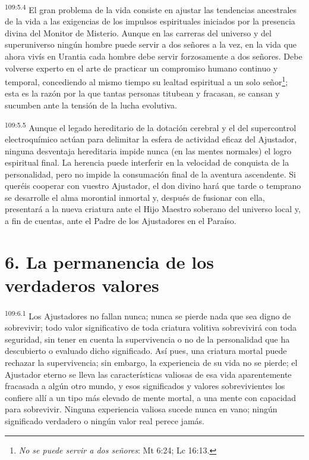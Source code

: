 \documentclass[twoside, 11pt]{book}
\begin{document}
\par
\textsuperscript{109:5.4} El gran problema de la vida consiste en ajustar las tendencias ancestrales de la vida a las exigencias de los impulsos espirituales iniciados por la presencia divina del Monitor de Misterio. Aunque en las carreras del universo y del superuniverso ningún hombre puede servir a dos señores a la vez, en la vida que ahora vivís en Urantia cada hombre debe servir forzosamente a dos señores. Debe volverse experto en el arte de practicar un compromiso humano continuo y temporal, concediendo al mismo tiempo su lealtad espiritual a un solo señor\footnote{\textit{No se puede servir a dos señores}: Mt 6:24; Lc 16:13.}; esta es la razón por la que tantas personas titubean y fracasan, se cansan y sucumben ante la tensión de la lucha evolutiva.

\par
\textsuperscript{109:5.5} Aunque el legado hereditario de la dotación cerebral y el del supercontrol electroquímico actúan para delimitar la esfera de actividad eficaz del Ajustador, ninguna desventaja hereditaria impide nunca (en las mentes normales) el logro espiritual final. La herencia puede interferir en la velocidad de conquista de la personalidad, pero no impide la consumación final de la aventura ascendente. Si queréis cooperar con vuestro Ajustador, el don divino hará que tarde o temprano se desarrolle el alma morontial inmortal y, después de fusionar con ella, presentará a la nueva criatura ante el Hijo Maestro soberano del universo local y, a fin de cuentas, ante el Padre de los Ajustadores en el Paraíso.

\section*{6. La permanencia de los verdaderos valores}
\par
\textsuperscript{109:6.1} Los Ajustadores no fallan nunca; nunca se pierde nada que sea digno de sobrevivir; todo valor significativo de toda criatura volitiva sobrevivirá con toda seguridad, sin tener en cuenta la supervivencia o no de la personalidad que ha descubierto o evaluado dicho significado. Así pues, una criatura mortal puede rechazar la supervivencia; sin embargo, la experiencia de su vida no se pierde; el Ajustador eterno se lleva las características valiosas de esa vida aparentemente fracasada a algún otro mundo, y esos significados y valores sobrevivientes los confiere allí a un tipo más elevado de mente mortal, a una mente con capacidad para sobrevivir. Ninguna experiencia valiosa sucede nunca en vano; ningún significado verdadero o ningún valor real perece jamás.
\end{document}
